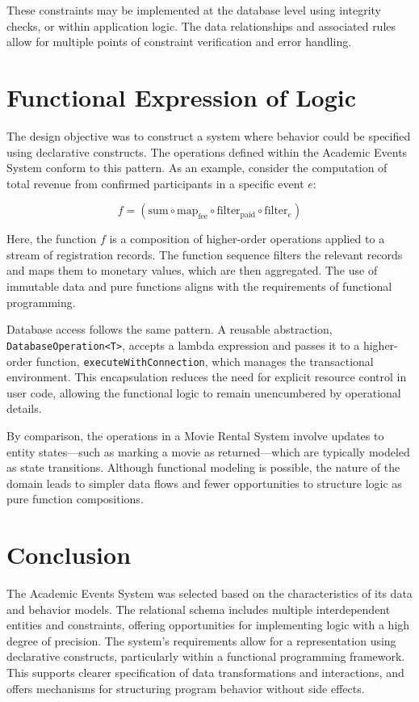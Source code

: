 \documentclass[12pt, a4paper]{article}
\begin{document}
These constraints may be implemented at the database level using integrity checks, or within application logic. The data relationships and associated rules allow for multiple points of constraint verification and error handling.

\section{Functional Expression of Logic}
The design objective was to construct a system where behavior could be specified using declarative constructs. The operations defined within the Academic Events System conform to this pattern. As an example, consider the computation of total revenue from confirmed participants in a specific event $e$:

\[
f = (\text{sum} \circ \text{map}_{\text{fee}} \circ \text{filter}_{\text{paid}} \circ \text{filter}_{e})
\]

Here, the function $f$ is a composition of higher-order operations applied to a stream of registration records. The function sequence filters the relevant records and maps them to monetary values, which are then aggregated. The use of immutable data and pure functions aligns with the requirements of functional programming.

Database access follows the same pattern. A reusable abstraction, \texttt{DatabaseOperation<T>}, accepts a lambda expression and passes it to a higher-order function, \texttt{executeWithConnection}, which manages the transactional environment. This encapsulation reduces the need for explicit resource control in user code, allowing the functional logic to remain unencumbered by operational details.

By comparison, the operations in a Movie Rental System involve updates to entity states—such as marking a movie as returned—which are typically modeled as state transitions. Although functional modeling is possible, the nature of the domain leads to simpler data flows and fewer opportunities to structure logic as pure function compositions.

\section{Conclusion}
The Academic Events System was selected based on the characteristics of its data and behavior models. The relational schema includes multiple interdependent entities and constraints, offering opportunities for implementing logic with a high degree of precision. The system’s requirements allow for a representation using declarative constructs, particularly within a functional programming framework. This supports clearer specification of data transformations and interactions, and offers mechanisms for structuring program behavior without side effects.
\end{document}
